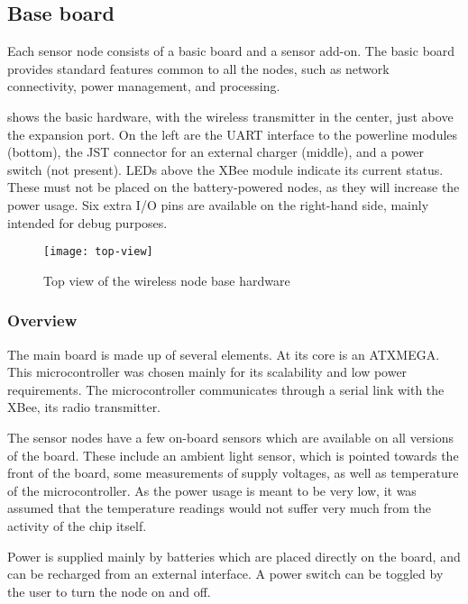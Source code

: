 \subsection{Base board}

Each sensor node consists of a basic board and a sensor add-on. The basic board
provides standard features common to all the nodes, such as network
connectivity, power management, and processing.

 shows the basic hardware, with the wireless transmitter
in the center, just above the expansion port. On the left are the UART interface
to the powerline modules (bottom), the JST connector for an external charger
(middle), and a power switch (not present). LEDs above the XBee module indicate
its current status. These must not be placed on the battery-powered nodes, as
they will increase the power usage. Six extra I/O pins are available on the
right-hand side, mainly intended for debug purposes.

\begin{figure}[h]
  \begin{center}
    \texttt{[image: top-view]}
  \end{center}
  \caption{Top view of the wireless node base hardware}
  \label{fig:base-topview}
\end{figure}

\subsubsection{Overview}

The main board is made up of several elements. At its core is an ATXMEGA. This
microcontroller was chosen mainly for its scalability and low power
requirements. The microcontroller communicates through a serial link with the
XBee, its radio transmitter.

The sensor nodes have a few on-board sensors which are available on all versions
of the board. These include an ambient light sensor, which is pointed towards
the front of the board, some measurements of supply voltages, as well as
temperature of the microcontroller. As the power usage is meant to be very low,
it was assumed that the temperature readings would not suffer very much from
the activity of the chip itself.

Power is supplied mainly by batteries which are placed directly on the board,
and can be recharged from an external interface. A power switch can be toggled
by the user to turn the node on and off.

